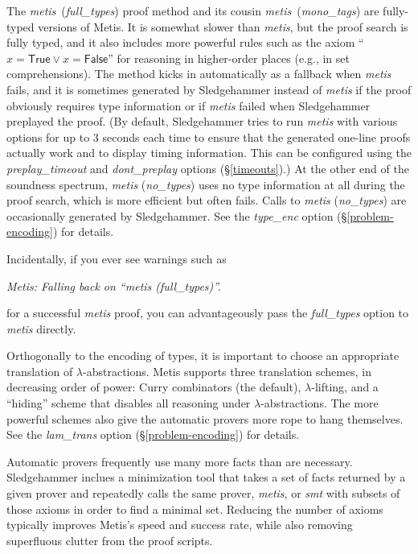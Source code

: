 \documentclass[a4paper,12pt]{article}
\newcommand\const[1]{\textsf{#1}}
\begin{document}
The \textit{metis}~(\textit{full\_types}) proof method
and its cousin \textit{metis}~(\textit{mono\_tags}) are fully-typed
versions of Metis. It is somewhat slower than \textit{metis}, but the proof
search is fully typed, and it also includes more powerful rules such as the
axiom ``$x = \const{True} \mathrel{\lor} x = \const{False}$'' for reasoning in
higher-order places (e.g., in set comprehensions). The method kicks in
automatically as a fallback when \textit{metis} fails, and it is sometimes
generated by Sledgehammer instead of \textit{metis} if the proof obviously
requires type information or if \textit{metis} failed when Sledgehammer
preplayed the proof. (By default, Sledgehammer tries to run \textit{metis} with
various options for up to 3 seconds each time to ensure that the generated
one-line proofs actually work and to display timing information. This can be
configured using the \textit{preplay\_timeout} and \textit{dont\_preplay}
options (\S\ref{timeouts}).)
%
At the other end of the soundness spectrum, \textit{metis} (\textit{no\_types})
uses no type information at all during the proof search, which is more efficient
but often fails. Calls to \textit{metis} (\textit{no\_types}) are occasionally
generated by Sledgehammer.
%
See the \textit{type\_enc} option (\S\ref{problem-encoding}) for details.

Incidentally, if you ever see warnings such as

\prew
\slshape
Metis: Falling back on ``\textit{metis} (\textit{full\_types})''.
\postw

for a successful \textit{metis} proof, you can advantageously pass the
\textit{full\_types} option to \textit{metis} directly.


Orthogonally to the encoding of types, it is important to choose an appropriate
translation of $\lambda$-abstractions. Metis supports three translation schemes,
in decreasing order of power: Curry combinators (the default),
$\lambda$-lifting, and a ``hiding'' scheme that disables all reasoning under
$\lambda$-abstractions. The more powerful schemes also give the automatic
provers more rope to hang themselves. See the \textit{lam\_trans} option (\S\ref{problem-encoding}) for details.


Automatic provers frequently use many more facts than are necessary.
Sledgehammer inclues a minimization tool that takes a set of facts returned by a
given prover and repeatedly calls the same prover, \textit{metis}, or
\textit{smt} with subsets of those axioms in order to find a minimal set.
Reducing the number of axioms typically improves Metis's speed and success rate,
while also removing superfluous clutter from the proof scripts.
\end{document}
